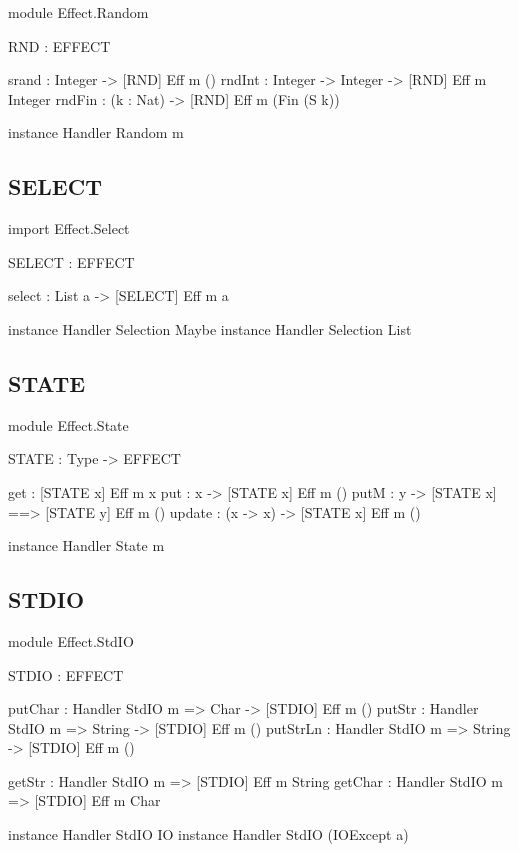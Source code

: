 \begin{code}
module Effect.Random

RND : EFFECT

srand  : Integer ->            { [RND] } Eff m ()
rndInt : Integer -> Integer -> { [RND] } Eff m Integer
rndFin : (k : Nat) ->          { [RND] } Eff m (Fin (S k))

instance Handler Random m
\end{code}

\subsection{SELECT}

\begin{code}
import Effect.Select

SELECT : EFFECT

select : List a -> { [SELECT] } Eff m a 

instance Handler Selection Maybe
instance Handler Selection List
\end{code}


\subsection{STATE}

\begin{code}
module Effect.State

STATE : Type -> EFFECT

get    :             { [STATE x] } Eff m x
put    : x ->        { [STATE x] } Eff m () 
putM   : y ->        { [STATE x] ==> [STATE y] } Eff m () 
update : (x -> x) -> { [STATE x] } Eff m () 

instance Handler State m
\end{code}

\subsection{STDIO}

\begin{code}
module Effect.StdIO

STDIO : EFFECT

putChar  : Handler StdIO m => Char ->   { [STDIO] } Eff m ()
putStr   : Handler StdIO m => String -> { [STDIO] } Eff m ()
putStrLn : Handler StdIO m => String -> { [STDIO] } Eff m ()

getStr   : Handler StdIO m =>           { [STDIO] } Eff m String
getChar  : Handler StdIO m =>           { [STDIO] } Eff m Char

instance Handler StdIO IO
instance Handler StdIO (IOExcept a)
\end{code}

